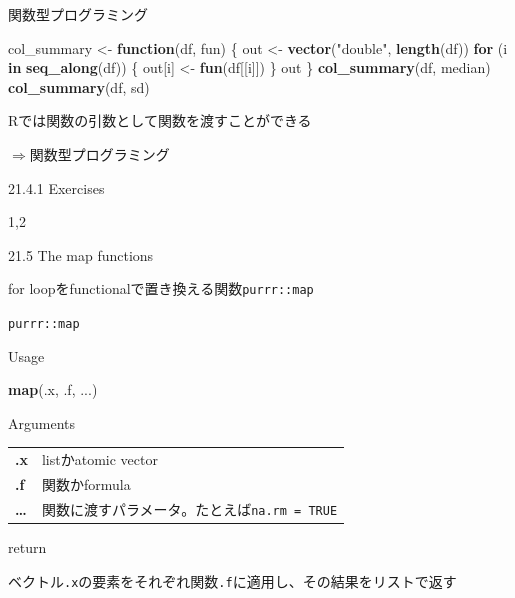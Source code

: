 \documentclass[ignorenonframetext,]{beamer}
\newenvironment{Shaded}{\begin{snugshade}}{\end{snugshade}}
\newcommand{\KeywordTok}[1]{\textcolor[rgb]{0.13,0.29,0.53}{\textbf{#1}}}
\newcommand{\StringTok}[1]{\textcolor[rgb]{0.31,0.60,0.02}{#1}}
\newcommand{\ControlFlowTok}[1]{\textcolor[rgb]{0.13,0.29,0.53}{\textbf{#1}}}
\newcommand{\NormalTok}[1]{#1}
\begin{document}
\begin{frame}[fragile]{関数型プログラミング}

\begin{Shaded}
\begin{Highlighting}[]
\NormalTok{col_summary <-}\StringTok{ }\ControlFlowTok{function}\NormalTok{(df, fun) \{}
\NormalTok{    out <-}\StringTok{ }\KeywordTok{vector}\NormalTok{(}\StringTok{"double"}\NormalTok{, }\KeywordTok{length}\NormalTok{(df))}
  \ControlFlowTok{for}\NormalTok{ (i }\ControlFlowTok{in} \KeywordTok{seq_along}\NormalTok{(df)) \{}
\NormalTok{        out[i] <-}\StringTok{ }\KeywordTok{fun}\NormalTok{(df[[i]])}
\NormalTok{    \}}
\NormalTok{    out}
\NormalTok{\}}
\KeywordTok{col_summary}\NormalTok{(df, median)}
\KeywordTok{col_summary}\NormalTok{(df, sd)}
\end{Highlighting}
\end{Shaded}

Rでは関数の引数として関数を渡すことができる

\(\Rightarrow\)関数型プログラミング

\end{frame}

\begin{frame}{21.4.1 Exercises}

1,2

\end{frame}

\begin{frame}[fragile]{21.5 The map functions}

for loopをfunctionalで置き換える関数\texttt{purrr::map}

\end{frame}

\begin{frame}[fragile]{\texttt{purrr::map}}

\begin{block}{Usage}

\begin{Shaded}
\begin{Highlighting}[]
\KeywordTok{map}\NormalTok{(.x, .f, ...)}
\end{Highlighting}
\end{Shaded}

\end{block}

\begin{block}{Arguments}

\begin{longtable}[]{@{}ll@{}}
\toprule
\textbf{.x} & listかatomic vector\tabularnewline
\textbf{.f} & 関数かformula\tabularnewline
\textbf{\ldots{}} &
関数に渡すパラメータ。たとえば\texttt{na.rm\ =\ TRUE}\tabularnewline
\bottomrule
\end{longtable}

\end{block}

\begin{block}{return}

ベクトル\texttt{.x}の要素をそれぞれ関数\texttt{.f}に適用し、その結果をリストで返す

\end{block}

\end{frame}
\end{document}
